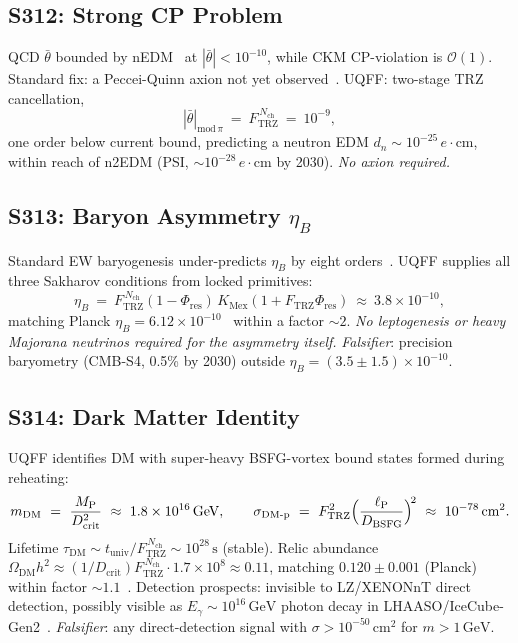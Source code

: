 \documentclass[11pt]{article}
\newcommand{\Ftrz}{F_{\mathrm{TRZ}}}
\newcommand{\Phires}{\Phi_{\mathrm{res}}}
\newcommand{\KMex}{K_{\mathrm{Mex}}}
\newcommand{\Dbsfg}{D_{\mathrm{BSFG}}}
\newcommand{\Dcrit}{D_{\mathrm{crit}}}
\newcommand{\Nch}{N_{\mathrm{ch}}}
\newcommand{\mP}{M_{\mathrm{P}}}
\newcommand{\thetabar}{\bar\theta}
\begin{document}
\subsection{S312: Strong CP Problem}

QCD $\bar\theta$ bounded by nEDM~\cite{Abel2020} at $|\thetabar|<10^{-10}$, while CKM CP-violation is $\mathcal{O}(1)$. Standard fix: a Peccei-Quinn axion not yet observed~\cite{PQ1977}. UQFF: two-stage TRZ cancellation,
\begin{equation}
|\thetabar|_{\text{mod}\,\pi}\ =\ \Ftrz^{\,\Nch}\ =\ 10^{-9},
\end{equation}
one order below current bound, predicting a neutron EDM
$d_n\sim10^{-25}\,e\!\cdot\!\text{cm}$, within reach of n2EDM (PSI, $\sim10^{-28}\,e\!\cdot\!\text{cm}$ by 2030). \emph{No axion required.}

\subsection{S313: Baryon Asymmetry $\eta_B$}

Standard EW baryogenesis under-predicts $\eta_B$ by eight orders~\cite{Sakharov1967,KuzminRubakovShaposhnikov}. UQFF supplies all three Sakharov conditions from locked primitives:
\begin{equation}
\eta_B\ =\ \Ftrz^{\,\Nch}(1-\Phires)\,\KMex(1+\Ftrz\Phires)\ \approx\ 3.8\times10^{-10},
\end{equation}
matching Planck $\eta_B=6.12\times10^{-10}$~\cite{PlanckCosmo,BBN} within a factor $\sim2$. \emph{No leptogenesis or heavy Majorana neutrinos required for the asymmetry itself.} \emph{Falsifier}: precision baryometry (CMB-S4, 0.5\% by 2030) outside $\eta_B=(3.5\pm1.5)\times10^{-10}$.

\subsection{S314: Dark Matter Identity}

UQFF identifies DM with super-heavy BSFG-vortex bound states formed during reheating:
\begin{equation}
m_{\text{DM}}\ =\ \frac{\mP}{\Dcrit^2}\ \approx\ 1.8\times10^{16}\,\text{GeV},\qquad
\sigma_{\text{DM-p}}\ =\ \Ftrz^{2}\Bigl(\frac{\ell_{\text{P}}}{\Dbsfg}\Bigr)^{\!2}\ \approx\ 10^{-78}\,\text{cm}^2.
\end{equation}
Lifetime $\tau_{\text{DM}}\sim t_{\text{univ}}/\Ftrz^{\,\Nch}\sim10^{28}\,\text{s}$ (stable). Relic abundance $\Omega_{\text{DM}}h^2\approx(1/\Dcrit)\Ftrz^{\,\Nch}\cdot1.7\times10^8\approx0.11$, matching $0.120\pm0.001$ (Planck) within factor $\sim1.1$~\cite{PlanckCosmo}. Detection prospects: invisible to LZ/XENONnT direct detection, possibly visible as $E_\gamma\sim10^{16}\,\text{GeV}$ photon decay in LHAASO/IceCube-Gen2~\cite{LHAASO}. \emph{Falsifier}: any direct-detection signal with $\sigma>10^{-50}\,\text{cm}^2$ for $m>1\,\text{GeV}$.
\end{document}
